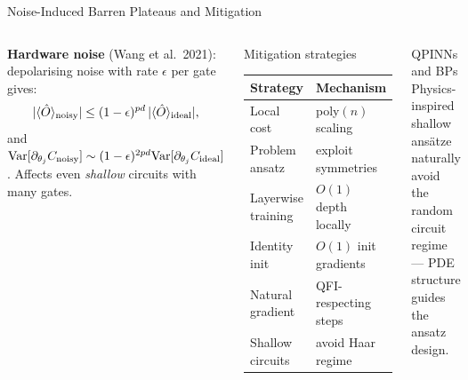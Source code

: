 \documentclass[aspectratio=169,11pt]{beamer}
\newcommand{\Variance}{\mathrm{Var}}
\begin{document}
\begin{frame}{Noise-Induced Barren Plateaus and Mitigation}
  \begin{columns}[T]
    \textbf{Hardware noise} (Wang et al.\ 2021): depolarising
    noise with rate $\epsilon$ per gate gives:
    \[
      |\langle\hat{O}\rangle_{\rm noisy}|
      \leq (1-\epsilon)^{pd}\,
      |\langle\hat{O}\rangle_{\rm ideal}|,
    \]
    and $\Variance[\partial_{\theta_j}C_{\rm noisy}]
      \sim (1-\epsilon)^{2pd}\Variance[\partial_{\theta_j}C_{\rm ideal}]$.
    Affects even \emph{shallow} circuits with many gates.
    \begin{block}{Mitigation strategies}
      \footnotesize
      \begin{tabular}{ll}
        \textbf{Strategy} & \textbf{Mechanism} \\
        \midrule
        Local cost & poly$(n)$ scaling \\
        Problem ansatz & exploit symmetries \\
        Layerwise training & $O(1)$ depth locally \\
        Identity init & $O(1)$ init gradients \\
        Natural gradient & QFI-respecting steps \\
        Shallow circuits & avoid Haar regime \\
      \end{tabular}
    \end{block}
    \begin{alertblock}{QPINNs and BPs}
      Physics-inspired shallow ans\"atze naturally avoid
      the random circuit regime --- PDE structure
      guides the ansatz design.
    \end{alertblock}
  \end{columns}
\end{frame}
\end{document}
